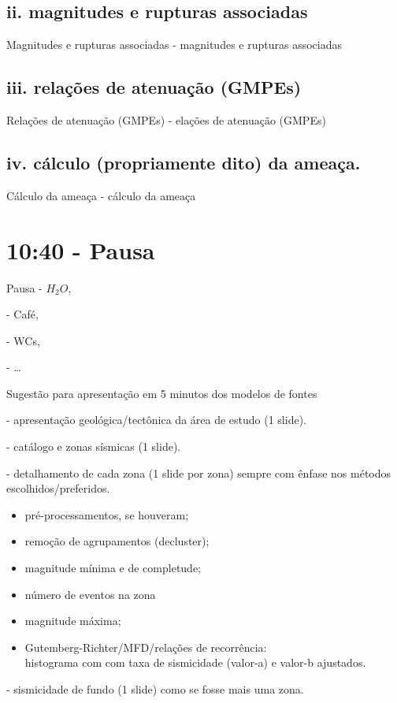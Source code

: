 \documentclass[ucs,8pt]{beamer}
\begin{document}
	\subsection{ii. magnitudes e rupturas associadas}
	\begin{frame}{Magnitudes e rupturas associadas}
		- magnitudes e rupturas associadas
	\end{frame}


	\subsection{iii. relações de atenuação (GMPEs)}
	\begin{frame}{Relações de atenuação (GMPEs)}
		- elações de atenuação (GMPEs)
	\end{frame}

	
	\subsection{iv. cálculo (propriamente dito) da ameaça.}
	\begin{frame}{Cálculo da ameaça}
		- cálculo da ameaça
	\end{frame}


\section{10:40 - Pausa}
	\begin{frame}{Pausa}
		- $H_2O$, 
		
		- Café, 
		
		- WCs,
		
		- \ldots
	\end{frame}

	\begin{frame}{Sugestão para apresentação em 5 minutos dos modelos de fontes}
		
		- apresentação geológica/tectônica da área de estudo (1 slide).
	
		- catálogo e zonas sísmicas (1 slide).
	
		- detalhamento de cada zona (1 slide por zona) sempre com ênfase nos métodos
		escolhidos/preferidos.
		
			\begin{itemize}
			  	\item pré-processamentos, se houveram;
				\item remoção de agrupamentos (decluster);
				\item magnitude mínima e de completude;
				\item número de eventos na zona
				\item magnitude máxima;
				\item Gutemberg-Richter/MFD/relações de recorrência:\\
				histograma com com taxa de sismicidade (valor-a) e valor-b ajustados.
			\end{itemize}
	
		- sismicidade de fundo (1 slide) como se fosse mais uma zona. 
	
	\end{frame}
\end{document}
